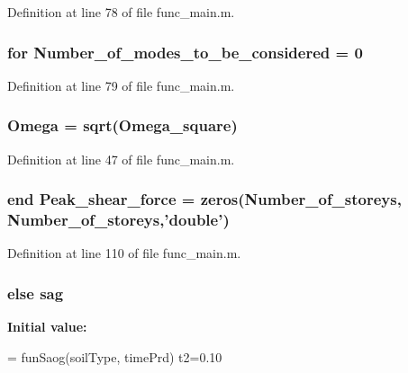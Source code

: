 Definition at line 78 of file func\-\_\-main.\-m.

\subsubsection[{Number\-\_\-of\-\_\-modes\-\_\-to\-\_\-be\-\_\-considered}]{\setlength{\rightskip}{0pt plus 5cm}for Number\-\_\-of\-\_\-modes\-\_\-to\-\_\-be\-\_\-considered = 0}\label{func__main_8m_a1034ee45b0411e5b452175e522e6e87a}


Definition at line 79 of file func\-\_\-main.\-m.

\subsubsection[{Omega}]{\setlength{\rightskip}{0pt plus 5cm}Omega = sqrt(Omega\-\_\-square)}\label{func__main_8m_abd44e0f647c914787c461677b6933451}


Definition at line 47 of file func\-\_\-main.\-m.

\subsubsection[{Peak\-\_\-shear\-\_\-force}]{\setlength{\rightskip}{0pt plus 5cm}end Peak\-\_\-shear\-\_\-force = zeros(Number\-\_\-of\-\_\-storeys, Number\-\_\-of\-\_\-storeys,'double')}\label{func__main_8m_a5bf27342fe06cf8dc956564530a388ea}


Definition at line 110 of file func\-\_\-main.\-m.

\subsubsection[{sag}]{\setlength{\rightskip}{0pt plus 5cm}else sag}\label{func__main_8m_aac9abc95cd2ddc27fa84fb4440b62888}
{\bfseries Initial value\-:}
\begin{DoxyCode}
= funSaog(soilType, timePrd)
    t2=0.10
\end{DoxyCode}



